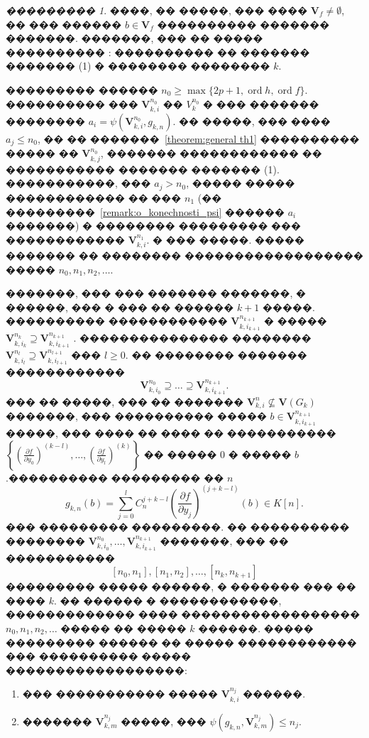 \documentclass[16pt]{article}
\DeclareMathOperator{\ord}{ord}
\theoremstyle{plain}
\theoremstyle{definition}
\theoremstyle{remark}
\newtheorem{remark}[theorem]{���������}
\begin{document}
\begin{remark}\label{remark:o_syshestvovvanii reshenia c zadannoi glubinoi}
����, �� �����, ��� ���� $\mathbf{V}_f\neq\emptyset$, �� ��� ������ $b\in\mathbf{V}_f$ ���������� ������� �������. �������, ��� �� ����� ���������� : ���������� �� ������� ������� (1) � �������� �������� $k$.

��������� ������ $n_0\geqslant\max\{ 2p+1,\ord{h},\ord{f}\}$. ���������� ��� $\mathbf{V}_{k,i}^{n_0}$ �� $V_k^{n_0}$  � ��� ������� �������� $a_i=\psi(\mathbf{V}_{k,i}^{n_0},g_{k,n})$. �� �����, ��� ���� $a_j\leqslant n_0$, �� �� �������~\ref{theorem:general th1} ���������� ����� �� $\mathbf{V}_{k,j}^{n_0}$, ������� ������������ �� ����������� ������� ������� (1). �����������, ��� $a_j>n_0$, ����� ����� ������������ �� ��� $n_1$ (�� ���������~\ref{remark:o_konechnosti_psi} ������ $a_i$ �������) � �������� ��������� ��� ������������ $\mathbf{V}_{k,i}^{n_1}$. � ��� �����. ����� ������� �� �������� ������������������ ����� $n_0,n_1,n_2,\ldots$.

�������, ��� ��� ������� �������, � ������, ��� � ��� �� ������ $k+1$ �����. ���������� ������������ $\mathbf{V}_{k,i_{k+1}}^{n_{k+1}}$  � ����� $\mathbf{V}_{k,i_{k}}^{n_{k}}\supseteq \mathbf{V}_{k,i_{k+1}}^{n_{k+1}}$ . ��������������� �������� $\mathbf{V}_{k,i_{l}}^{n_{l}}\supseteq \mathbf{V}_{k,i_{l+1}}^{n_{l+1}}$ ��� $l\geqslant 0$. �� �������� ������� ������������
$$
\mathbf{V}_{k,i_{0}}^{n_{0}}\supseteq\ldots\supseteq \mathbf{V}_{k,i_{k+1}}^{n_{k+1}}.
$$
   ��� �� �����, ��� �� ������� $\mathbf{V}_{k,i}^n \not\subseteq \mathbf{V}(G_k)$ �������, ��� ���������� ����� $b\in \mathbf{V}_{k,i_{k+1}}^{n_{k+1}}$ �����, ��� ���� �� ���� �� ����������� $\left\{\left(\frac{\partial f}{\partial y_0}\right)^{(k-l)},\ldots, \left(\frac{\partial f}{\partial y_l}\right)^{(k)} \right\}$ �� ����� 0 � ����� $b$.���������� ��������� �� $n$
$$
g_{k,n}(b)=\sum\limits_{j=0}^{l}C_n^{j+k - l }\left(\frac{\partial f}{\partial y_j}\right)^{(j+k - l)}(b)\in K[n].
$$
��� ��������� ���������. �� ���������� �������� $\mathbf{V}_{k,i_{0}}^{n_{0}},\ldots, \mathbf{V}_{k,i_{k+1}}^{n_{k+1}}$ �������, ��� �� ����������� $$[n_0,n_1],[n_1,n_2],\ldots,[n_k,n_{k+1}]$$
��������� ����� ������, � ������� ��� �� ���� $k$. �� ������ � ������������, ������������� ���� ������������������  $n_0,n_1,n_2,\ldots$ ����� �� ����� $k$ ������. ����� ��������� ������ �� ����� ������������ ��� ���������� ����� ������������������:

\begin{enumerate}
  \item ��� ����������� ����� $\mathbf{V}_{k,i}^{n_j}$ ������.
  \item ������� $\mathbf{V}_{k,m}^{n_j}$ �����, ��� $ \psi(g_{k,n},\mathbf{V}_{k,m}^{n_j})\leqslant n_j$.
\end{enumerate}


\end{remark}
\end{document}
